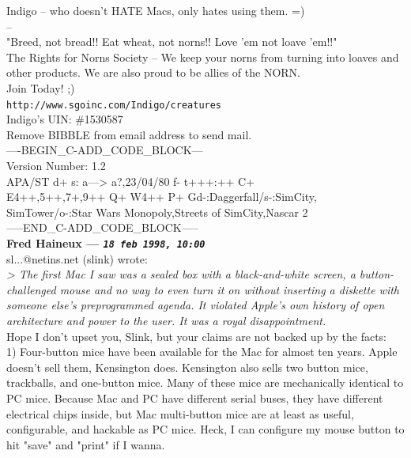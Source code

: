 \documentclass[11pt,twoside,a4paper]{article}
\begin{document}
\begin{multicols*}{2}
Indigo -- who doesn't HATE Macs, only hates using them. =)~\\

-- ~\\
"Breed, not bread!! Eat wheat, not norns!! Love 'em not loave 'em!!"~\\
The Rights for Norns Society -- We keep your norns from turning into loaves and other products. We are also proud to be allies of the NORN.~\\
Join Today! ;)~\\
\texttt{http://www.sgoinc.com/Indigo/creatures}~\\
Indigo's UIN: \#1530587~\\
Remove BIBBLE from email address to send mail.~\\

----BEGIN\_C-ADD\_CODE\_BLOCK---~\\
Version Number: 1.2~\\
APA/ST d+ s: a---> a?,23/04/80 f- t+++:++ C+~\\
E4++,5++,7+,9++ Q+ W4++ P+ Gd-:Daggerfall/s-:SimCity,~\\
SimTower/o-:Star Wars Monopoly,Streets of SimCity,Nascar 2~\\
-----END\_C-ADD\_CODE\_BLOCK-----~\\

 
		
	
		
\textbf{Fred Haineux --- \emph{\texttt{18 feb 1998, 10:00}}}~\\

sl...@netins.net (slink) wrote:~\\
\emph{> The first Mac I saw was a sealed box with a black-and-white screen, a button-challenged mouse and no way to even turn it on without inserting a diskette with someone else's preprogrammed agenda.  It violated Apple's own history of open architecture and power to the user.  It was a royal disappointment.}~\\

Hope I don't upset you, Slink, but your claims are not backed up by the facts:~\\

1) Four-button mice have been available for the Mac for almost ten years. Apple doesn't sell them, Kensington does. Kensington also sells two button mice, trackballs, and one-button mice. Many of these mice are mechanically identical to PC mice. Because Mac and PC have different serial buses, they have different electrical chips inside, but Mac multi-button mice are at least as useful, configurable, and hackable as PC mice. Heck, I can configure my mouse button to hit "save" and "print" if I wanna.~\\


\end{multicols*}
\end{document}
